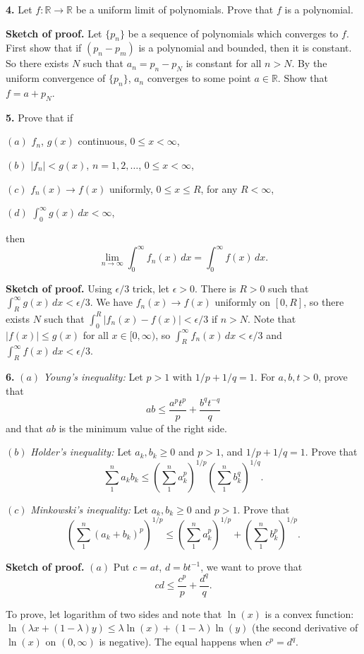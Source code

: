 \documentclass{article}
\begin{document}
    \textbf{4.} Let $f:\mathbb{R}\to\mathbb{R}$ be a uniform limit of
polynomials. Prove that $f$ is a polynomial.

\textbf{Sketch of proof.} Let $\{p_n\}$ be a sequence of polynomials
which converges to $f$. First show that if $(p_n - p_m)$ is a polynomial
and bounded, then it is constant. So there exists $N$ such that
$a_n = p_n - p_N$ is constant for all $n > N$. By the uniform
convergence of $\{p_n\}$, $a_n$ converges to some point
$a\in \mathbb{R}$. Show that $f = a + p_N$.

    \textbf{5.} Prove that if

$(a)$ $f_n$, $g(x)$ continuous, $0 \le x < \infty$,

$(b)$ $|f_n| < g(x)$, $n = 1,2,\ldots$, $0 \le x < \infty$,

$(c)$ $f_n(x) \to f(x)$ uniformly, $0 \le x \le R$, for any
$R < \infty$,

$(d)$ $\int_0^{\infty}g(x)\,dx < \infty$,

then
\[\lim_{n\to\infty}\int_0^{\infty}f_n(x)\,dx= \int_0^{\infty}f(x)\,dx.\]

    \textbf{Sketch of proof.} Using $\epsilon/3$ trick, let $\epsilon > 0$.
There is $R>0$ such that $\int_R^{\infty} g(x)\,dx < \epsilon/3$. We
have $f_n(x) \to f(x)$ uniformly on $[0,R]$, so there exists $N$ such
that $\int_0^R|f_n(x) - f(x)| < \epsilon/3$ if $n > N$. Note that
$|f(x)| \le g(x)$ for all $x\in [0,\infty)$, so
$\int_R^{\infty} f_n(x)\,dx < \epsilon/3$ and
$\int_R^{\infty} f(x)\,dx < \epsilon/3$.

    \textbf{6.} $(a)$ \emph{Young's inequality:} Let $p>1$ with $1/p+1/q=1$.
For $a,b,t>0$, prove that \[ab\le \frac{a^pt^p}{p}+\frac{b^qt^{-q}}{q}\]
and that $ab$ is the minimum value of the right side.

$(b)$ \emph{Holder's inequality:} Let $a_k,b_k\ge 0$ and $p > 1$, and
$1/p + 1/q = 1$. Prove that
\[\sum_1^n a_kb_k\le \left(\sum_1^n a_k^p\right)^{1/p} \left(\sum_1^n b_k^q\right)^{1/q}.\]

$(c)$ \emph{Minkowski's inequality:} Let $a_k,b_k\ge 0$ and $p > 1$.
Prove that
\[\left(\sum_1^n (a_k+b_k)^p\right)^{1/p}\le \left(\sum_1^n a_k^p\right)^{1/p} + \left(\sum_1^n b_k^p\right)^{1/p}.\]

\textbf{Sketch of proof.} $(a)$ Put $c=at$, $d=bt^{-1}$, we want to
prove that \[ cd \le \frac{c^p}{p} + \frac{d^q}{q}.\]

To prove, let logarithm of two sides and note that $\ln(x)$ is a convex
function:
$\ln(\lambda x + (1-\lambda)y)\le \lambda\ln(x)+(1-\lambda)\ln(y)$ (the
second derivative of $\ln(x)$ on $(0,\infty)$ is negative). The equal
happens when $c^p = d^q$.
\end{document}
